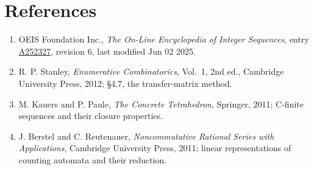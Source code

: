 \documentclass[11pt]{article}
\theoremstyle{definition}
\begin{document}
\section{References}

\begin{enumerate}

\item OEIS Foundation Inc., \emph{The On-Line Encyclopedia of Integer Sequences}, entry \href{https://oeis.org/A252327}{A252327}, revision 6, last modified Jun 02 2025.

\item R. P. Stanley, \emph{Enumerative Combinatorics}, Vol.~1, 2nd ed., Cambridge University Press, 2012; \S4.7, the transfer-matrix method.

\item M. Kauers and P. Paule, \emph{The Concrete Tetrahedron}, Springer, 2011; C-finite sequences and their closure properties.

\item J. Berstel and C. Reutenauer, \emph{Noncommutative Rational Series with Applications}, Cambridge University Press, 2011; linear representations of counting automata and their reduction.

\end{enumerate}
\end{document}
